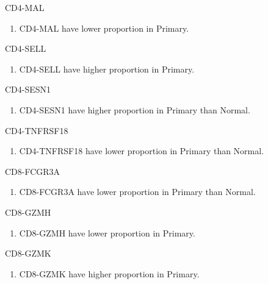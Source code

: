 \documentclass{beamer}
\begin{document}
\begin{frame}[allowframebreaks]
        \begin{block}{CD4-MAL}
            \begin{enumerate}
                \item CD4-MAL have lower proportion in Primary.
            \end{enumerate}
        \end{block}

        \begin{block}{CD4-SELL}
            \begin{enumerate}
                \item CD4-SELL have higher proportion in Primary.
            \end{enumerate}
        \end{block}

        \begin{block}{CD4-SESN1}
            \begin{enumerate}
                \item CD4-SESN1 have higher proportion in Primary than Normal.
            \end{enumerate}
        \end{block}

        \begin{block}{CD4-TNFRSF18}
            \begin{enumerate}
                \item CD4-TNFRSF18 have lower proportion in Primary than Normal.
            \end{enumerate}
        \end{block}

        \begin{block}{CD8-FCGR3A}
            \begin{enumerate}
                \item CD8-FCGR3A have lower proportion in Primary than Normal.
            \end{enumerate}
        \end{block}

        \begin{block}{CD8-GZMH}
            \begin{enumerate}
                \item CD8-GZMH have lower proportion in Primary.
            \end{enumerate}
        \end{block}

        \begin{block}{CD8-GZMK}
            \begin{enumerate}
                \item CD8-GZMK have higher proportion in Primary.
            \end{enumerate}
        \end{block}


\end{frame}
\end{document}
